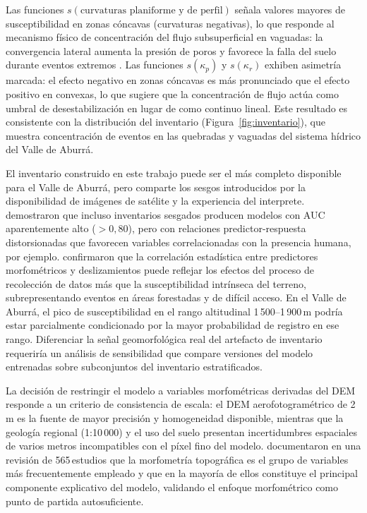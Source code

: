 \documentclass[12pt,a4paper]{article}
\begin{document}
Las funciones $s(\text{curvaturas planiforme y de perfil})$ señala valores mayores de susceptibilidad en zonas cóncavas (curvaturas negativas), lo que
responde al mecanismo físico de concentración del flujo subsuperficial
en vaguadas: la convergencia lateral aumenta la presión de poros y
favorece la falla del suelo durante eventos extremos
\citep{beven1979physically}. Las funciones $s(\kappa_p)$ y $s(\kappa_r)$
exhiben asimetría marcada: el efecto negativo en zonas cóncavas es más
pronunciado que el efecto positivo en convexas, lo que sugiere que la
concentración de flujo actúa como umbral de desestabilización en lugar
de como continuo lineal. Este resultado es consistente con la
distribución del inventario (Figura~\ref{fig:inventario}), que muestra
concentración de eventos en las quebradas y vaguadas del sistema hídrico
del Valle de Aburrá.

El inventario construido en este trabajo puede ser el más completo disponible para el Valle de
Aburrá, pero comparte los sesgos introducidos por la disponibilidad de imágenes de satélite y la experiencia del interprete. \citet{steger2017} demostraron que
incluso inventarios sesgados producen modelos con AUC
aparentemente alto ($> 0{,}80$), pero con relaciones predictor-respuesta
distorsionadas que favorecen variables correlacionadas con la presencia
humana, por ejemplo. \citet{Steger2021correlation} confirmaron que la correlación
estadística entre predictores morfométricos y deslizamientos puede
reflejar los efectos del proceso de recolección de datos más que la
susceptibilidad intrínseca del terreno, subrepresentando eventos en
áreas forestadas y de difícil acceso.
En el Valle de Aburrá, el pico de susceptibilidad en el rango altitudinal
1\,500--1\,900\,m podría estar parcialmente condicionado por la mayor
probabilidad de registro en ese rango. Diferenciar la
señal geomorfológica real del artefacto de inventario requeriría un
análisis de sensibilidad que compare versiones del modelo entrenadas
sobre subconjuntos del inventario estratificados.

La decisión de restringir el modelo a variables morfométricas derivadas
del DEM responde a un criterio de consistencia de escala: el DEM
aerofotogramétrico de 2\,m es la fuente de mayor precisión y
homogeneidad disponible, mientras que la geología regional (1:10\,000)
y el uso del suelo presentan incertidumbres espaciales de varios
metros incompatibles con el píxel fino del modelo. \citet{reichenbach2018review} documentaron en una revisión de
565\,estudios que la morfometría topográfica es el grupo de variables
más frecuentemente empleado y que en la mayoría de ellos constituye
el principal componente explicativo del modelo, validando el enfoque
morfométrico como punto de partida autosuficiente.
\end{document}
